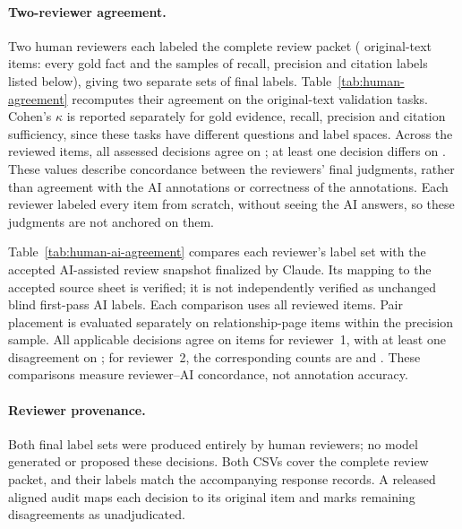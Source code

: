 \paragraph{Two-reviewer agreement.}
Two human reviewers each labeled the complete review packet (
original-text items: every gold fact and the samples of recall, precision and citation
labels listed below), giving two separate sets of final labels. Table~\ref{tab:human-agreement} recomputes their agreement on the original-text
validation tasks. Cohen's $\kappa$ is reported separately for gold evidence, recall,
precision and citation sufficiency, since these tasks have different questions and label
spaces. Across the  reviewed items, all assessed decisions agree on
; at least one decision differs on .
These values describe concordance between the reviewers' final judgments, rather than
agreement with the AI annotations or correctness of the annotations. Each reviewer labeled
every item from scratch, without seeing the AI answers, so these judgments are not anchored
on them.



Table~\ref{tab:human-ai-agreement} compares each reviewer's label set with the accepted
AI-assisted review snapshot finalized by Claude. Its mapping to the accepted source sheet
is verified; it is not independently verified as unchanged blind first-pass AI labels.
Each comparison uses all  reviewed items. Pair placement is evaluated separately on
 relationship-page items within the precision sample.
All applicable decisions agree on  items for reviewer~1, with at least
one disagreement on ; for reviewer~2, the corresponding counts
are  and .
These comparisons measure reviewer--AI concordance, not annotation accuracy.

\paragraph{Reviewer provenance.}
Both final label sets were produced entirely by human reviewers; no model generated or
proposed these decisions. Both CSVs cover the complete review
packet, and their labels match the accompanying response records. A released aligned audit
maps each decision to its original item and marks remaining disagreements as unadjudicated.


